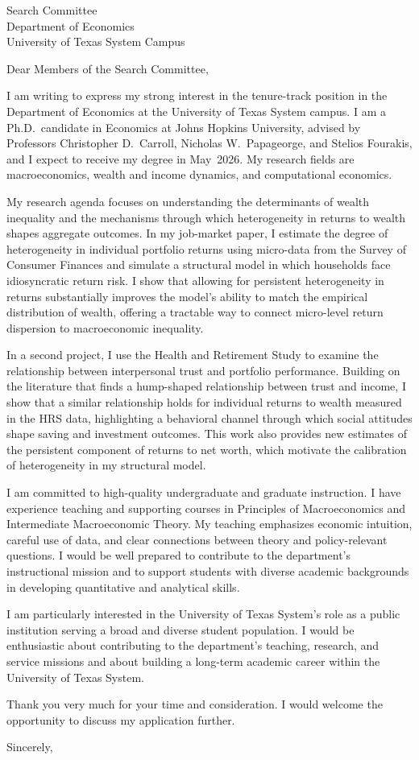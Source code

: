 \documentclass[11pt,letterpaper]{letter}
\begin{document}
\begin{letter}{
Search Committee \\
Department of Economics \\
University of Texas System Campus
}

\opening{Dear Members of the Search Committee,}

I am writing to express my strong interest in the tenure-track position in the Department of Economics at the University of Texas System campus. I am a Ph.D.\ candidate in Economics at Johns Hopkins University, advised by Professors Christopher D.~Carroll, Nicholas W.~Papageorge, and Stelios Fourakis, and I expect to receive my degree in May~2026. My research fields are macroeconomics, wealth and income dynamics, and computational economics.

My research agenda focuses on understanding the determinants of wealth inequality and the mechanisms through which heterogeneity in returns to wealth shapes aggregate outcomes. In my job-market paper, I estimate the degree of heterogeneity in individual portfolio returns using micro-data from the Survey of Consumer Finances and simulate a structural model in which households face idiosyncratic return risk. I show that allowing for persistent heterogeneity in returns substantially improves the model’s ability to match the empirical distribution of wealth, offering a tractable way to connect micro-level return dispersion to macroeconomic inequality.

In a second project, I use the Health and Retirement Study to examine the relationship between interpersonal trust and portfolio performance. Building on the literature that finds a hump-shaped relationship between trust and income, I show that a similar relationship holds for individual returns to wealth measured in the HRS data, highlighting a behavioral channel through which social attitudes shape saving and investment outcomes. This work also provides new estimates of the persistent component of returns to net worth, which motivate the calibration of heterogeneity in my structural model.

I am committed to high-quality undergraduate and graduate instruction. I have experience teaching and supporting courses in Principles of Macroeconomics and Intermediate Macroeconomic Theory. My teaching emphasizes economic intuition, careful use of data, and clear connections between theory and policy-relevant questions. I would be well prepared to contribute to the department’s instructional mission and to support students with diverse academic backgrounds in developing quantitative and analytical skills.

I am particularly interested in the University of Texas System’s role as a public institution serving a broad and diverse student population. I would be enthusiastic about contributing to the department’s teaching, research, and service missions and about building a long-term academic career within the University of Texas System.

Thank you very much for your time and consideration. I would welcome the opportunity to discuss my application further.

\closing{Sincerely,}

\end{letter}
\end{document}
